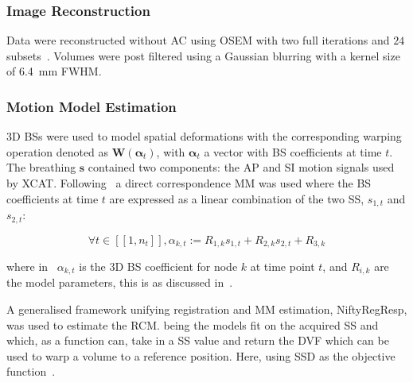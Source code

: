             \subsubsection{Image Reconstruction} \label{sec:impact_of_tof_on_respiratory_motion_model_estimation_using_pre_gated_no_intra_cycle_motion_nac_pet_methods_image_reconstruction}
                Data were reconstructed without \gls{AC} using \gls{OSEM} with two full iterations and $24$ subsets~. Volumes were post filtered using a Gaussian blurring with a kernel size of \SI{6.4}{\milli\metre} \gls{FWHM}.
            
            \subsubsection{Motion Model Estimation} \label{sec:impact_of_tof_on_respiratory_motion_model_estimation_using_pre_gated_no_intra_cycle_motion_nac_pet_methods_motion_model_estimation}
                \gls{3D} \gls{BS}s were used to model spatial deformations with the corresponding warping operation denoted as $\mathbf{W}(\mathbf{\alpha}_t)$, with $\mathbf{\alpha}_t$ a vector with \gls{BS} coefficients at time $t$. The breathing  $\mathbf{s}$ contained two components: the \gls{AP} and \gls{SI} motion signals used by \gls{XCAT}. Following~ a direct correspondence \gls{MM} was used where the \gls{BS} coefficients at time $t$ are expressed as a linear combination of the two \gls{SS}, $s_{1,t}$ and $s_{2,t}$:
            
                \begin{equation}\label{eq:impact_of_tof_on_respiratory_motion_model_estimation_using_pre_gated_no_intra_cycle_motion_nac_pet_methods_motion_parameters}
                    \forall t \in [[1,n_t]], \alpha_{k,t} := R_{1,k} s_{1,t} + R_{2,k} s_{2,t} + R_{3,k}
                \end{equation}
                
                \noindent where in~ $\alpha_{k,t}$ is the \gls{3D} \gls{BS} coefficient for node $k$ at time point $t$, and $R_{i,k}$ are the model parameters, this is as discussed in~.
            
                A generalised framework unifying registration and \gls{MM} estimation, NiftyRegResp, was used to estimate the \gls{RCM}.  being the models fit on the acquired \gls{SS} and  which, as a function can, take in a \gls{SS} value and return the \gls{DVF} which can be used to warp a volume to a reference position. Here, using \gls{SSD} as the objective function~.
                
